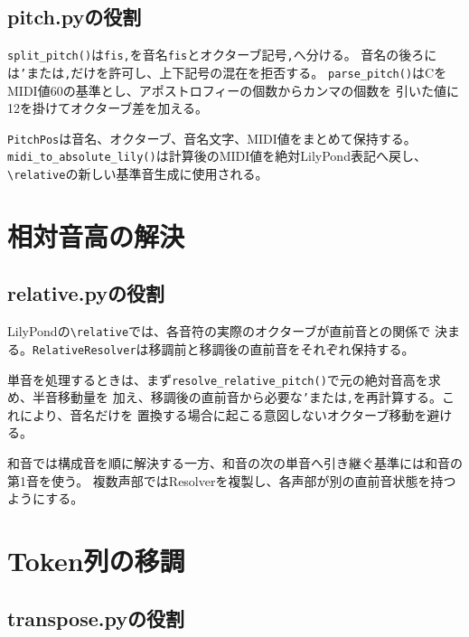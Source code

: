 \documentclass[uplatex,a4paper,11pt]{jsbook}
\begin{document}
\section{pitch.pyの役割}

\texttt{split\_pitch()}は\texttt{fis,}を音名\texttt{fis}とオクターブ記号\texttt{,}へ分ける。
音名の後ろには\texttt{'}または\texttt{,}だけを許可し、上下記号の混在を拒否する。
\texttt{parse\_pitch()}はCをMIDI値60の基準とし、アポストロフィーの個数からカンマの個数を
引いた値に12を掛けてオクターブ差を加える。

\texttt{PitchPos}は音名、オクターブ、音名文字、MIDI値をまとめて保持する。
\texttt{midi\_to\_absolute\_lily()}は計算後のMIDI値を絶対LilyPond表記へ戻し、
\texttt{\textbackslash relative}の新しい基準音生成に使用される。



\chapter{相対音高の解決}

\section{relative.pyの役割}

LilyPondの\texttt{\textbackslash relative}では、各音符の実際のオクターブが直前音との関係で
決まる。\texttt{RelativeResolver}は移調前と移調後の直前音をそれぞれ保持する。

単音を処理するときは、まず\texttt{resolve\_relative\_pitch()}で元の絶対音高を求め、半音移動量を
加え、移調後の直前音から必要な\texttt{'}または\texttt{,}を再計算する。これにより、音名だけを
置換する場合に起こる意図しないオクターブ移動を避ける。

和音では構成音を順に解決する一方、和音の次の単音へ引き継ぐ基準には和音の第1音を使う。
複数声部ではResolverを複製し、各声部が別の直前音状態を持つようにする。



\chapter{Token列の移調}

\section{transpose.pyの役割}
\end{document}

